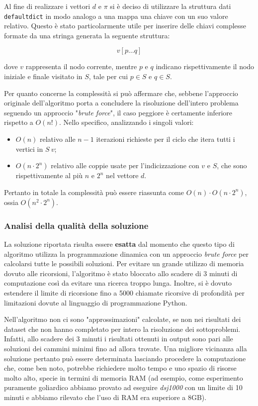 Al fine di realizzare i vettori \(d\) e \(\pi\) si è deciso di utilizzare la struttura dati \texttt{defaultdict} in modo analogo a una mappa una chiave con un suo valore relativo. Questo è stato particolarmente utile per inserire delle chiavi complesse formate da una stringa generata la seguente struttura: 

\[ v [ p \dots q ]\]

dove \(v\) rappresenta il nodo corrente, mentre \(p\) e \(q\) indicano rispettivamente il nodo iniziale e finale visitato in \(S\), tale per cui \(p \in S\) e \(q \in S\).

Per quanto concerne la complessità si può affermare che, sebbene l'approccio originale dell'algoritmo porta a concludere la risoluzione dell'intero problema seguendo un approccio "\textit{brute force}", il caso peggiore è certamente inferiore rispetto a \(O(n!)\). 
Nello specifico, analizzando i singoli valori:

\begin{itemize}
    \item \(O(n)\) relativo alle \(n-1\) iterazioni richieste per il ciclo che itera tutti i vertici in \(S \ {v}\);
    \item \(O(n\cdot2^n)\) relativo alle coppie usate per l'indicizzazione con \(v\) e \(S\), che sono rispettivamente al più \(n\) e \(2^n\) nel vettore \(d\).
\end{itemize}
Pertanto in totale la complessità può essere riassunta come \(O(n) \cdot O(n\cdot2^n)\), ossia \(O(n^2\cdot2^n)\).

\subsubsection{Analisi della qualità della soluzione}

La soluzione riportata risulta essere \textbf{esatta} dal momento che questo tipo di algoritmo utilizza la programmazione dinamica con un approccio \textit{brute force} per calcolarsi tutte le possibili soluzioni. Per evitare un grande utilizzo di memoria dovuto alle ricorsioni, l'algoritmo è stato bloccato allo scadere di 3 minuti di computazione così da evitare una ricerca troppo lunga.
Inoltre, si è dovuto estendere il limite di ricorsione fino a 5000 chiamate ricorsive di profondità per limitazioni dovute al linguaggio di programmazione Python.

Nell'algoritmo non ci sono "approssimazioni" calcolate, se non nei risultati dei dataset che non hanno completato per intero la risoluzione dei sottoproblemi. Infatti, allo scadere dei 3 minuti i risultati ottenuti in output sono pari alle soluzioni dei cammini minimi fino ad allora trovate. Una migliore vicinanza alla soluzione pertanto può essere determinata lasciando procedere la computazione che, come ben noto, potrebbe richiedere molto tempo e uno spazio di risorse molto alto, specie in termini di memoria RAM (ad esempio, come esperimento puramente goliardico abbiamo provato ad eseguire \textit{dsj1000} con un limite di 10 minuti e abbiamo rilevato che l'uso di RAM era superiore a 8GB). 

